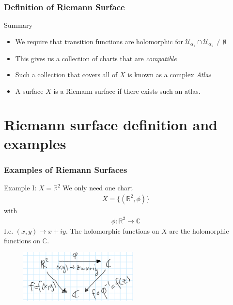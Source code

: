 \documentclass{beamer}[10]
\begin{document}
\begin{frame}
	\frametitle{Definition of Riemann Surface}
	\begin{block}{Summary}
	\begin{itemize}
		\item We require that transition functions are holomorphic for $\mathcal{U}_{\alpha_1}\cap \mathcal{U}_{\alpha_2}\neq \emptyset$
		\item This gives us a collection of charts that are \textit{compatible}
		\item Such a collection that covers all of $X$ is known as a complex \textit{Atlas}
		\item A surface $X$ is a Riemann surface if there exists such an atlas.
	\end{itemize}
	\end{block}
\end{frame} 
\section{Riemann surface definition and examples}
\begin{frame}
	\frametitle{Examples of Riemann Surfaces}
	\begin{block}{Example I: $X=\mathds{R}^2$}
		We only need one chart
		\begin{equation}
			\begin{aligned}
				X=\{(\mathds{R}^2,\phi)\}
			\end{aligned}
		\end{equation}
		with
		\begin{equation}
			\begin{aligned}
				\phi: \mathds{R}^2\to \mathds{C}
			\end{aligned}
		\end{equation}
	I.e. $(x,y)\to x+iy$. The holomorphic functions on $X$ are the holomorphic functions on $\mathds{C}$.
	\end{block}
\begin{figure}
	\includegraphics[width=6cm]{6}
\end{figure}
\end{frame} 
\end{document}
